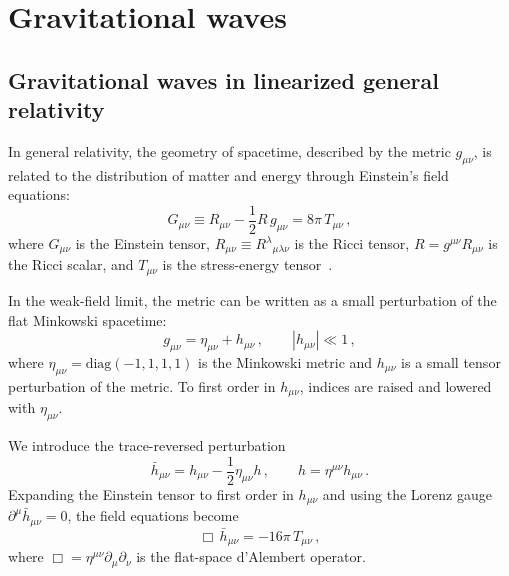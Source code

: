 \chapter{Gravitational waves} \label{chpt:GW}

    \section{Gravitational waves in linearized general relativity}

    In general relativity, the geometry of spacetime, described by the metric
    $g_{\mu\nu}$, is related to the distribution of matter and energy through
    Einstein's field equations:
    \begin{equation}
        G_{\mu\nu} \equiv R_{\mu\nu} - \frac{1}{2} R\, g_{\mu\nu} = 8\pi\, T_{\mu\nu} \, ,
        \label{eq:einstein}
    \end{equation}
    where $G_{\mu\nu}$ is the Einstein tensor, $R_{\mu\nu} \equiv R^{\lambda}{}_{\mu\lambda\nu}$
    is the Ricci tensor,
    $R = g^{\mu\nu} R_{\mu\nu}$ is the Ricci scalar, and $T_{\mu\nu}$ is the
    stress-energy tensor~\cite{Maggiore2008}.

    In the weak-field limit, the metric can be
    written as a small perturbation of the flat Minkowski spacetime:
    \begin{equation}
        g_{\mu\nu} = \eta_{\mu\nu} + h_{\mu\nu}\, , \qquad |h_{\mu\nu}| \ll 1\, ,
        \label{eq:metrica_perturbata}
    \end{equation}
    where $\eta_{\mu\nu} = \mathrm{diag}(-1, 1, 1, 1)$ is the Minkowski metric and
    $h_{\mu\nu}$ is a small tensor perturbation of the metric. To first order in
    $h_{\mu\nu}$, indices are raised and lowered with $\eta_{\mu\nu}$.

    We introduce the trace-reversed perturbation
    \begin{equation}
        \bar h_{\mu\nu} = h_{\mu\nu} - \frac{1}{2}\eta_{\mu\nu} h \, ,
        \qquad h = \eta^{\mu\nu}h_{\mu\nu}\, .
        \label{eq:trace_reversed}
    \end{equation}
    Expanding the Einstein tensor to first order in $h_{\mu\nu}$ and using the
    Lorenz gauge $\partial^{\mu}\bar h_{\mu\nu} = 0$, the field equations become
    \begin{equation}
        \Box\, \bar h_{\mu\nu} = -16\pi\, T_{\mu\nu}\, ,
        \label{eq:einstein_linearizzata}
    \end{equation}
    where $\Box = \eta^{\mu\nu}\partial_\mu\partial_\nu$ is the flat-space d'Alembert operator.

